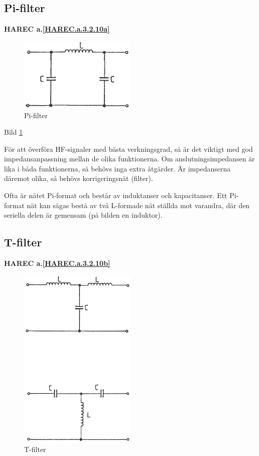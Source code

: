 \subsection{Pi-filter}
\textbf{HAREC a.\ref{HAREC.a.3.2.10a}\label{myHAREC.a.3.2.10a}}

\begin{figure}
\includegraphics[width=0.5\textwidth]{images/cropped_pdfs/bild_2_3-32.pdf}
\caption{Pi-filter}
\label{fig:BildII3-32}
\end{figure}

Bild \ref{fig:BildII3-32}

För att överföra HF-signaler med bästa verkningsgrad, så är det viktigt med god
impedansanpassning mellan de olika funktionerna. Om anslutningsimpedansen är
lika i båda funktionerna, så behövs inga extra åtgärder. Är impedanserna däremot
olika, så behövs korrigeringsnät (filter).

Ofta är nätet Pi-format och består av induktanser och kapacitanser. Ett
Pi-format nät kan sägas bestå av två L-formade nät ställda mot varandra, där
den seriella delen är gemensam (på bilden en induktor).

\subsection{T-filter}
\textbf{HAREC a.\ref{HAREC.a.3.2.10b}\label{myHAREC.a.3.2.10b}}

\begin{figure}
\includegraphics[width=0.5\textwidth]{images/cropped_pdfs/bild_2_3-33.pdf}
\caption{T-filter}
\label{fig:BildII3-33}
\end{figure}

